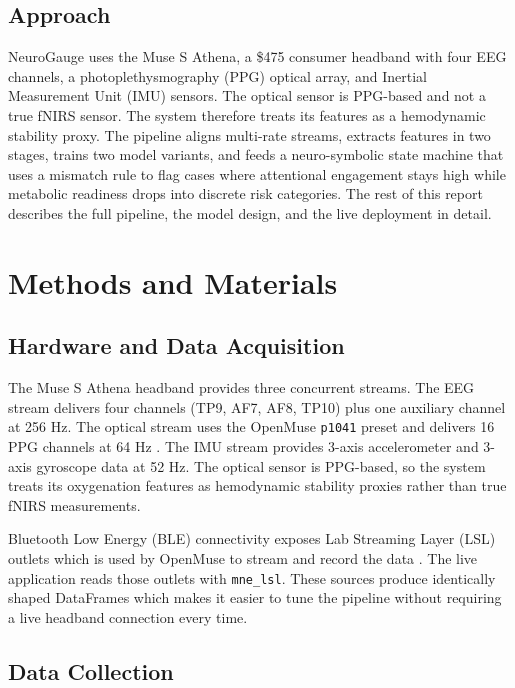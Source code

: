 \documentclass[conference]{IEEEtran}
\begin{document}
\subsection{Approach}

NeuroGauge uses the Muse S Athena, a \$475 consumer headband with four EEG channels, a photoplethysmography (PPG) optical array, and Inertial Measurement Unit (IMU) sensors. The optical sensor is PPG-based and not a true fNIRS sensor. The system therefore treats its features as a hemodynamic stability proxy. The pipeline aligns multi-rate streams, extracts features in two stages, trains two model variants, and feeds a neuro-symbolic state machine that uses a mismatch rule to flag cases where attentional engagement stays high while metabolic readiness drops into discrete risk categories. The rest of this report describes the full pipeline, the model design, and the live deployment in detail.

\section{Methods and Materials}

\subsection{Hardware and Data Acquisition}

The Muse S Athena headband provides three concurrent streams. The EEG stream delivers four channels (TP9, AF7, AF8, TP10) plus one auxiliary channel at 256 Hz. The optical stream uses the OpenMuse \texttt{p1041} preset and delivers 16 PPG channels at 64 Hz \cite{b8}. The IMU stream provides 3-axis accelerometer and 3-axis gyroscope data at 52 Hz. The optical sensor is PPG-based, so the system treats its oxygenation features as hemodynamic stability proxies rather than true fNIRS measurements.

Bluetooth Low Energy (BLE) connectivity exposes Lab Streaming Layer (LSL) outlets which is used by OpenMuse to stream and record the data \cite{b8}. The live application reads those outlets with \texttt{mne\_lsl}. These sources produce identically shaped DataFrames which makes it easier to tune the pipeline without requiring a live headband connection every time.

\subsection{Data Collection}
\end{document}
